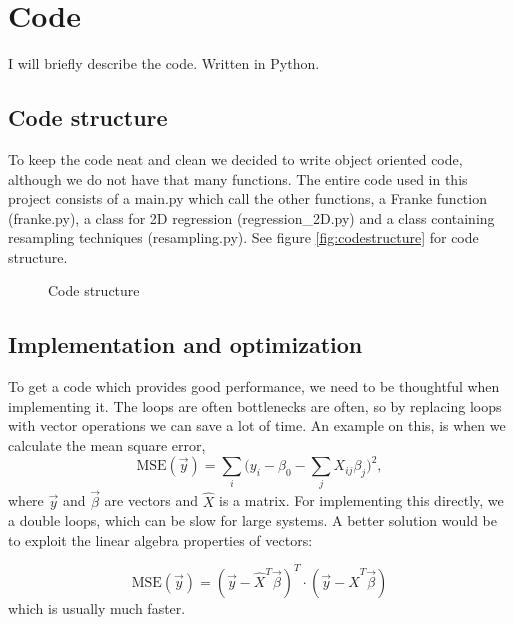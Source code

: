 \section{Code} \label{sec:code}
I will briefly describe the code. Written in Python.

\subsection{Code structure} \label{sec:structure}
To keep the code neat and clean we decided to write object oriented code, although we do not have that many functions. The entire code used in this project consists of a main.py which call the other functions, a Franke function (franke.py), a class for 2D regression (regression\_2D.py) and a class containing resampling techniques (resampling.py). See figure \eqref{fig:codestructure} for code structure.
\begin{figure}
\centering
{}
\caption{Code structure}
\label{fig:codestructure}
\end{figure}

\subsection{Implementation and optimization} \label{sec:implementation}
To get a code which provides good performance, we need to be thoughtful when implementing it. The loops are often bottlenecks are often, so by replacing loops with vector operations we can save a lot of time. An example on this, is when we calculate the mean square error,
\begin{equation}
\text{MSE}(\vec{y})=\sum_i\bigg(y_i-\beta_0-\sum_jX_{ij}\beta_j\bigg)^2,
\end{equation}
where $\vec{y}$ and $\vec{\beta}$ are vectors and $\hat{X}$ is a matrix. For implementing this directly, we a double loops, which can be slow for large systems. A better solution would be to exploit the linear algebra properties of vectors:

\begin{equation}
\text{MSE}(\vec{y})=(\vec{y}-\hat{X}^T\vec{\beta})^T\cdot(\vec{y}-\hat{X}^T\vec{\beta})
\end{equation}
which is usually much faster. 